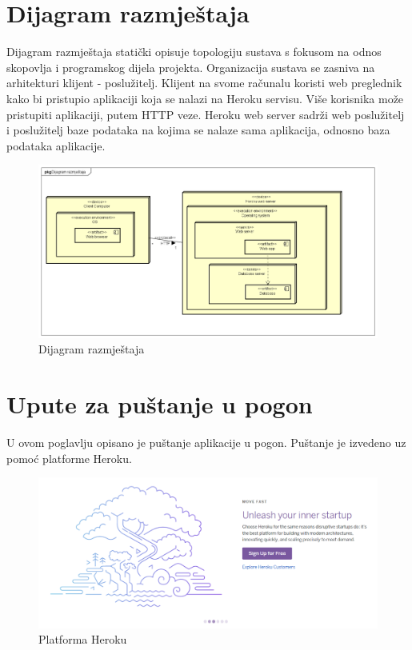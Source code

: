{		
		\section{Dijagram razmještaja}
			
			{Dijagram razmještaja statički opisuje topologiju sustava s fokusom na odnos skopovlja i programskog dijela projekta. Organizacija sustava se zasniva na arhitekturi klijent - poslužitelj. Klijent na svome računalu koristi web preglednik kako bi pristupio aplikaciji koja se nalazi na Heroku servisu. Više korisnika može pristupiti aplikaciji, putem HTTP veze. Heroku web server sadrži web poslužitelj i poslužitelj baze podataka na kojima se nalaze sama aplikacija, odnosno baza podataka aplikacije. }
				
				\begin{figure}[H]
					\centering
					\includegraphics[width=1\linewidth]{"slike/specDiagram.png"}
					\caption{Dijagram razmještaja}
					\label{fig:dij-raz}
				\end{figure}
			
			\eject 
		
		\section{Upute za puštanje u pogon}
		
			 {U ovom poglavlju opisano je puštanje aplikacije u pogon. Puštanje je izvedeno uz pomoć platforme Heroku. 
				\begin{figure}[H]
					\centering
					\includegraphics[width=1\linewidth]{"slike/herokuPocetna.png"}
					\caption{Platforma Heroku}
				\end{figure}
			
}}
